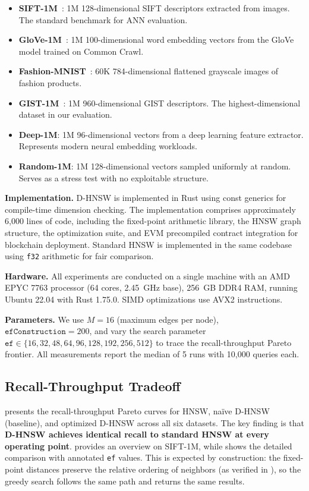 \documentclass[10pt,journal,compsoc]{IEEEtran}
\newcommand{\dhnsw}{\textsc{D-HNSW}}
\newcommand{\hnsw}{\textsc{HNSW}}
\begin{document}
\begin{itemize}[leftmargin=*]
  \item \textbf{SIFT-1M}~\cite{jegou2011sift}: 1M 128-dimensional SIFT descriptors extracted from images. The standard benchmark for ANN evaluation.
  \item \textbf{GloVe-1M}~\cite{pennington2014glove}: 1M 100-dimensional word embedding vectors from the GloVe model trained on Common Crawl.
  \item \textbf{Fashion-MNIST}~\cite{xiao2017fashion}: 60K 784-dimensional flattened grayscale images of fashion products.
  \item \textbf{GIST-1M}~\cite{oliva2001gist}: 1M 960-dimensional GIST descriptors. The highest-dimensional dataset in our evaluation.
  \item \textbf{Deep-1M}: 1M 96-dimensional vectors from a deep learning feature extractor. Represents modern neural embedding workloads.
  \item \textbf{Random-1M}: 1M 128-dimensional vectors sampled uniformly at random. Serves as a stress test with no exploitable structure.
\end{itemize}

\textbf{Implementation.} \dhnsw{} is implemented in Rust using const generics for compile-time dimension checking. The implementation comprises approximately 6{,}000 lines of code, including the fixed-point arithmetic library, the \hnsw{} graph structure, the optimization suite, and EVM precompiled contract integration for blockchain deployment. Standard \hnsw{} is implemented in the same codebase using \texttt{f32} arithmetic for fair comparison.

\textbf{Hardware.} All experiments are conducted on a single machine with an AMD EPYC 7763 processor (64 cores, 2.45~GHz base), 256~GB DDR4 RAM, running Ubuntu 22.04 with Rust 1.75.0. SIMD optimizations use AVX2 instructions.

\textbf{Parameters.} We use $M = 16$ (maximum edges per node), $\texttt{efConstruction} = 200$, and vary the search parameter $\texttt{ef} \in \{16, 32, 48, 64, 96, 128, 192, 256, 512\}$ to trace the recall-throughput Pareto frontier. All measurements report the median of 5 runs with 10{,}000 queries each.

\subsection{Recall-Throughput Tradeoff}

 presents the recall-throughput Pareto curves for \hnsw{}, na\"ive \dhnsw{} (baseline), and optimized \dhnsw{} across all six datasets. The key finding is that \textbf{\dhnsw{} achieves identical recall to standard \hnsw{} at every operating point}.  provides an overview on SIFT-1M, while  shows the detailed comparison with annotated \texttt{ef} values. This is expected by construction: the fixed-point distances preserve the relative ordering of neighbors (as verified in ), so the greedy search follows the same path and returns the same results.
\end{document}
